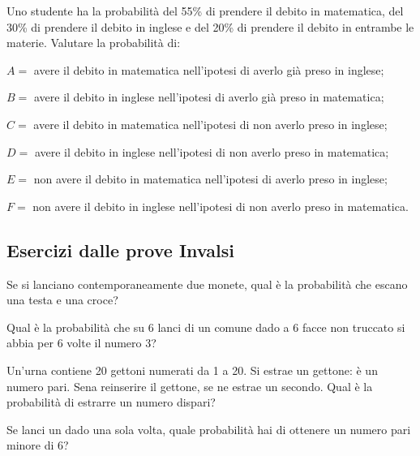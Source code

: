 \begin{esercizio}[\Ast]
 \label{ese:9.64}
Uno studente ha la probabilità del 55\% di prendere il debito in matematica, del 30\% di prendere il debito in inglese e del 20\% di prendere il debito in entrambe le materie. Valutare la probabilità di:
\begin{itemize*}
\item $ A= $ avere il debito in matematica nell'ipotesi di averlo già preso in inglese;
\item $ B= $ avere il debito in inglese nell'ipotesi di averlo già preso in matematica;
\item $ C= $ avere il debito in matematica nell'ipotesi di non averlo preso in inglese;
\item $ D= $ avere il debito in inglese nell'ipotesi di non averlo preso in matematica;
\item $ E= $ non avere il debito in matematica nell'ipotesi di averlo preso in inglese;
\item $ F= $ non avere il debito in inglese nell'ipotesi di non averlo preso in matematica.
\end{itemize*}
\end{esercizio}

\subsection*{Esercizi dalle prove Invalsi}

\begin{esercizio}%
Se si lanciano contemporaneamente due monete, qual è la probabilità che escano una testa e una croce?
\end{esercizio}

\begin{esercizio} %
Qual è la probabilità che su 6 lanci di un comune dado a 6 facce non truccato si abbia per 6 volte il numero 3?
\end{esercizio}

\begin{esercizio} %
Un'urna contiene 20 gettoni numerati da 1 a 20. Si estrae un gettone: è un numero pari. Sena reinserire il gettone, se ne estrae un secondo. Qual è la probabilità di estrarre un numero dispari?
\end{esercizio}

\begin{esercizio} %
Se lanci un dado una sola volta, quale probabilità hai di ottenere un numero pari minore di 6?
\end{esercizio}

